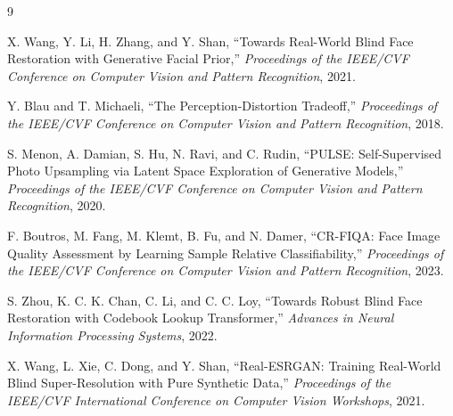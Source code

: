 \documentclass[UTF8,a4paper,11pt]{ctexart}
\begin{document}
\footnotesize
\begin{thebibliography}{9}

X. Wang, Y. Li, H. Zhang, and Y. Shan,
``Towards Real-World Blind Face Restoration with Generative Facial Prior,''
\textit{Proceedings of the IEEE/CVF Conference on Computer Vision and Pattern Recognition},
2021.

Y. Blau and T. Michaeli,
``The Perception-Distortion Tradeoff,''
\textit{Proceedings of the IEEE/CVF Conference on Computer Vision and Pattern Recognition},
2018.

S. Menon, A. Damian, S. Hu, N. Ravi, and C. Rudin,
``PULSE: Self-Supervised Photo Upsampling via Latent Space Exploration of Generative Models,''
\textit{Proceedings of the IEEE/CVF Conference on Computer Vision and Pattern Recognition},
2020.

F. Boutros, M. Fang, M. Klemt, B. Fu, and N. Damer,
``CR-FIQA: Face Image Quality Assessment by Learning Sample Relative Classifiability,''
\textit{Proceedings of the IEEE/CVF Conference on Computer Vision and Pattern Recognition},
2023.

S. Zhou, K. C. K. Chan, C. Li, and C. C. Loy,
``Towards Robust Blind Face Restoration with Codebook Lookup Transformer,''
\textit{Advances in Neural Information Processing Systems},
2022.

X. Wang, L. Xie, C. Dong, and Y. Shan,
``Real-ESRGAN: Training Real-World Blind Super-Resolution with Pure Synthetic Data,''
\textit{Proceedings of the IEEE/CVF International Conference on Computer Vision Workshops},
2021.

\end{thebibliography}
\normalsize
\end{document}
